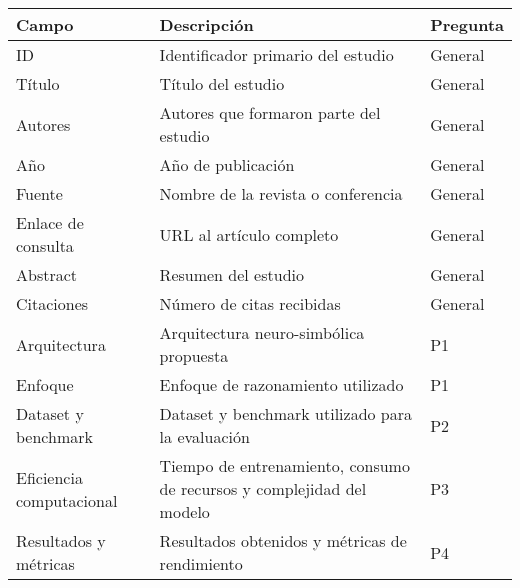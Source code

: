 \begin{frame}
    \begin{table}[h!]
        \centering
        {\footnotesize
            \begin{tabular}{|p{1.8cm}|p{5.5cm}|l|}
                \hline
                \textbf{Campo}           & \textbf{Descripción}                                                  & \textbf{Pregunta} \\ \hline
                ID                       & Identificador primario del estudio                                    & General           \\ \hline
                Título                   & Título del estudio                                                    & General           \\ \hline
                Autores                  & Autores que formaron parte del estudio                                & General           \\ \hline
                Año                      & Año de publicación                                                    & General           \\ \hline
                Fuente                   & Nombre de la revista o conferencia                                    & General           \\ \hline
                Enlace de consulta       & URL al artículo completo                                              & General           \\ \hline
                Abstract                 & Resumen del estudio                                                   & General           \\ \hline
                Citaciones               & Número de citas recibidas                                             & General           \\ \hline
                Arquitectura             & Arquitectura neuro-simbólica propuesta                                & P1                \\ \hline
                Enfoque                  & Enfoque de razonamiento utilizado                                     & P1                \\ \hline
                Dataset y benchmark      & Dataset y benchmark utilizado para la evaluación                      & P2                \\ \hline
                Eficiencia computacional & Tiempo de entrenamiento, consumo de recursos y complejidad del modelo & P3                \\ \hline
                Resultados y métricas    & Resultados obtenidos y métricas de rendimiento                        & P4                \\ \hline

\end{tabular}}
\end{table}
\end{frame}
